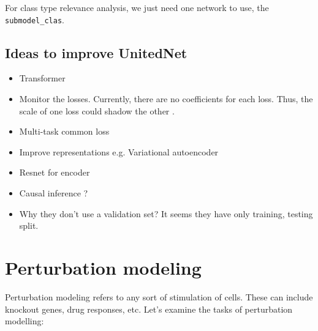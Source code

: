 \documentclass[12pt, a4paper]{article}
\newcommand*{\fullref}[1]{\hyperref[{#1}]{\ref*{#1} \nameref*{#1}}}
\begin{document}
For class type relevance analysis, we just need one network to use, the \verb|submodel_clas|.

\subsection{Ideas to improve UnitedNet}
\label{sec:improvements}

\cite{tangExplainableMultitaskLearning2023}

\begin{itemize}
  \itemsep -0.1em
  \item Transformer
  \item Monitor the losses. Currently, there are no coefficients for each loss. Thus, the scale of one loss could shadow the other \cite{kendallMultiTaskLearningUsing2018}.
  \item Multi-task common loss
  \item Improve representations e.g. Variational autoencoder
  \item Resnet for encoder
  \item Causal inference ?
  \item Why they don't use a validation set? It seems they have only training, testing split.
\end{itemize}


\clearpage

\section{Perturbation modeling}


Perturbation modeling refers to any sort of stimulation of cells. These can include knockout genes, drug responses, etc. Let's examine the tasks of perturbation modelling:
\end{document}
